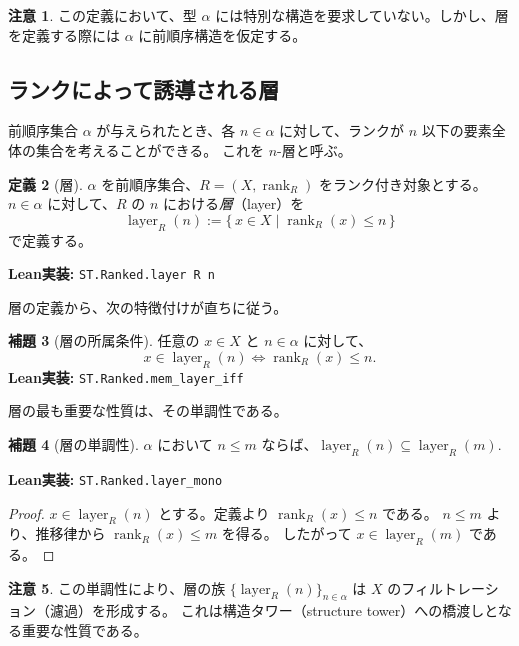 \documentclass[a4paper,12pt]{ltjsarticle}
\theoremstyle{definition}
\newtheorem{definition}{定義}[section]
\newtheorem{lemma}[definition]{補題}
\newtheorem{remark}[definition]{注意}
\begin{document}
\begin{remark}
この定義において、型 $\alpha$ には特別な構造を要求していない。しかし、層を定義する際には $\alpha$ に前順序構造を仮定する。
\end{remark}

\subsection{ランクによって誘導される層}

前順序集合 $\alpha$ が与えられたとき、各 $n \in \alpha$ に対して、ランクが $n$ 以下の要素全体の集合を考えることができる。
これを $n$-層と呼ぶ。

\begin{definition}[層]
\label{def:layer}
$\alpha$ を前順序集合、$R = (X, \operatorname{rank}_R)$ をランク付き対象とする。
$n \in \alpha$ に対して、$R$ の $n$ における\emph{層}（layer）を
\[
  \operatorname{layer}_R(n) := \{\,x \in X \mid \operatorname{rank}_R(x) \le n\,\}
\]
で定義する。

\textbf{Lean実装:} \texttt{ST.Ranked.layer R n}
\end{definition}

層の定義から、次の特徴付けが直ちに従う。

\begin{lemma}[層の所属条件]
\label{lem:mem-layer-iff}
任意の $x \in X$ と $n \in \alpha$ に対して、
\[
  x \in \operatorname{layer}_R(n) \iff \operatorname{rank}_R(x) \le n.
\]
\textbf{Lean実装:} \texttt{ST.Ranked.mem\_layer\_iff}
\end{lemma}

層の最も重要な性質は、その単調性である。

\begin{lemma}[層の単調性]
\label{lem:layer-mono}
$\alpha$ において $n \le m$ ならば、$\operatorname{layer}_R(n) \subseteq \operatorname{layer}_R(m)$.

\textbf{Lean実装:} \texttt{ST.Ranked.layer\_mono}
\end{lemma}

\begin{proof}
$x \in \operatorname{layer}_R(n)$ とする。定義より $\operatorname{rank}_R(x) \le n$ である。
$n \le m$ より、推移律から $\operatorname{rank}_R(x) \le m$ を得る。
したがって $x \in \operatorname{layer}_R(m)$ である。
\end{proof}

\begin{remark}
この単調性により、層の族 $\{\operatorname{layer}_R(n)\}_{n \in \alpha}$ は $X$ のフィルトレーション（濾過）を形成する。
これは構造タワー（structure tower）への橋渡しとなる重要な性質である。
\end{remark}
\end{document}
